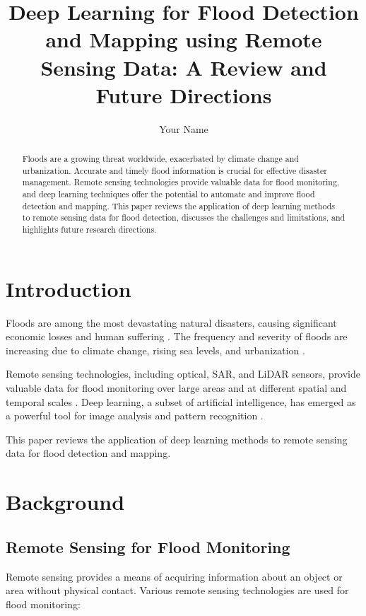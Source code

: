 \documentclass{article}
\title{Deep Learning for Flood Detection and Mapping using Remote Sensing Data: A Review and Future Directions}
\author{Your Name}
\date{}
\begin{document}
\maketitle

\begin{abstract}
Floods are a growing threat worldwide, exacerbated by climate change and urbanization. Accurate and timely flood information is crucial for effective disaster management. Remote sensing technologies provide valuable data for flood monitoring, and deep learning techniques offer the potential to automate and improve flood detection and mapping. This paper reviews the application of deep learning methods to remote sensing data for flood detection, discusses the challenges and limitations, and highlights future research directions.
\end{abstract}

\section{Introduction}
Floods are among the most devastating natural disasters, causing significant economic losses and human suffering \cite{Jonkman2005}. The frequency and severity of floods are increasing due to climate change, rising sea levels, and urbanization \cite{IPCC2021}.

Remote sensing technologies, including optical, SAR, and LiDAR sensors, provide valuable data for flood monitoring over large areas and at different spatial and temporal scales \cite{Schumann2018}. Deep learning, a subset of artificial intelligence, has emerged as a powerful tool for image analysis and pattern recognition \cite{LeCun2015}.

This paper reviews the application of deep learning methods to remote sensing data for flood detection and mapping.

\section{Background}

\subsection{Remote Sensing for Flood Monitoring}

Remote sensing provides a means of acquiring information about an object or area without physical contact. Various remote sensing technologies are used for flood monitoring:
\end{document}
